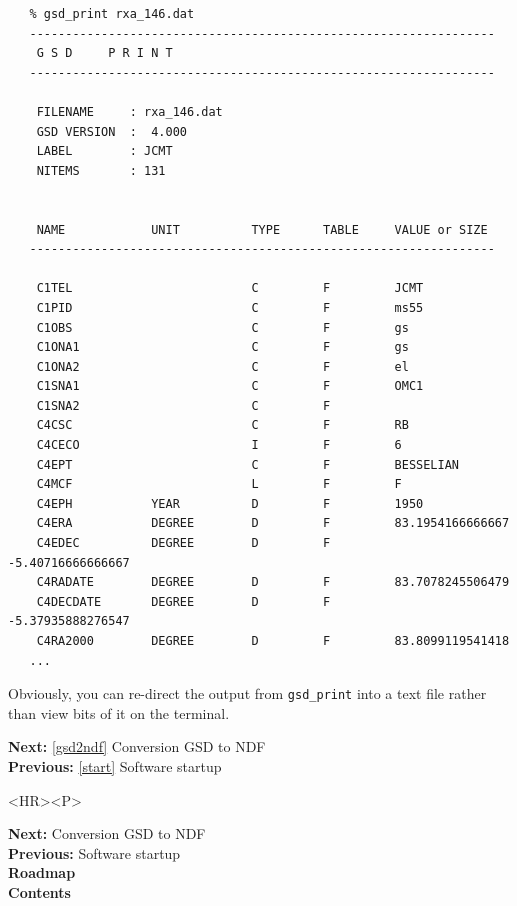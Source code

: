 \documentclass[11pt]{article}
\newenvironment{latexonly}{}{}
\newcommand{\htmlref}[2]{#1}
\begin{document}
\begin{verbatim}
   % gsd_print rxa_146.dat
   -----------------------------------------------------------------
    G S D     P R I N T
   -----------------------------------------------------------------

    FILENAME     : rxa_146.dat
    GSD VERSION  :  4.000
    LABEL        : JCMT
    NITEMS       : 131


    NAME            UNIT          TYPE      TABLE     VALUE or SIZE
   -----------------------------------------------------------------

    C1TEL                         C         F         JCMT
    C1PID                         C         F         ms55
    C1OBS                         C         F         gs
    C1ONA1                        C         F         gs
    C1ONA2                        C         F         el
    C1SNA1                        C         F         OMC1
    C1SNA2                        C         F
    C4CSC                         C         F         RB
    C4CECO                        I         F         6
    C4EPT                         C         F         BESSELIAN
    C4MCF                         L         F         F
    C4EPH           YEAR          D         F         1950
    C4ERA           DEGREE        D         F         83.1954166666667
    C4EDEC          DEGREE        D         F         -5.40716666666667
    C4RADATE        DEGREE        D         F         83.7078245506479
    C4DECDATE       DEGREE        D         F         -5.37935888276547
    C4RA2000        DEGREE        D         F         83.8099119541418
   ...
\end{verbatim}

   Obviously, you can re-direct the output from {\tt gsd\_print} into a
   text file rather than view bits of it on the terminal.

\begin{latexonly}
{\bf Next:} \ref{gsd2ndf} Conversion GSD to NDF\\
{\bf Previous:} \ref{start} Software startup\\
\end{latexonly}

\begin{htmlonly}
\begin{rawhtml} <HR><P> \end{rawhtml}
{\bf \htmlref{Next:}{gsd2ndf}} Conversion GSD to NDF\\
{\bf \htmlref{Previous:}{start}} Software startup\\
{\bf \htmlref{Roadmap}{roadmap}}\\
{\bf \htmlref{Contents}{stardoccontents}}\\
\end{htmlonly}
\end{document}
